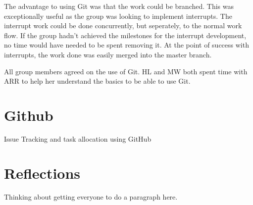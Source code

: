 The advantage to using Git was that the work could be branched.
This was exceptionally useful as the group was looking to implement interrupts.
The interrupt work could be done concurrently, but seperately, to the normal work flow. 
If the group hadn't achieved the milestones for the interrupt development, no time would have needed to be spent removing it.
At the point of success with interrupts, the work done was easily merged into the master branch. 

All group members agreed on the use of Git. 
HL and MW both spent time with ARR to help her understand the basics to be able to use Git.


\section{Github}
Issue Tracking and task allocation using GitHub



\section{Reflections}

Thinking about getting everyone to do a paragraph here.
